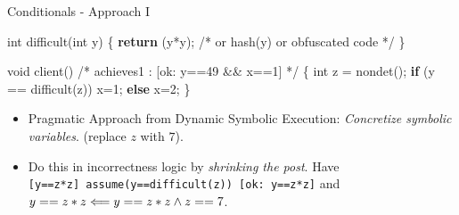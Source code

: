 \documentclass[
  10pt,
  ignorenonframetext,
]{beamer}
\newenvironment{Shaded}{\begin{snugshade}}{\end{snugshade}}
\newcommand{\CommentTok}[1]{\textcolor[rgb]{0.48,0.49,0.49}{#1}}
\newcommand{\ControlFlowTok}[1]{\textcolor[rgb]{0.99,0.74,0.29}{\textbf{#1}}}
\newcommand{\DataTypeTok}[1]{\textcolor[rgb]{0.16,0.50,0.73}{#1}}
\newcommand{\DecValTok}[1]{\textcolor[rgb]{0.96,0.45,0.00}{#1}}
\newcommand{\NormalTok}[1]{\textcolor[rgb]{0.81,0.81,0.76}{#1}}
\newcommand{\OperatorTok}[1]{\textcolor[rgb]{0.81,0.81,0.76}{#1}}
\newcommand{\simpliedby}{\DOTSB\Longleftarrow}
\begin{document}
\begin{frame}[fragile]{Conditionals - Approach I}
\label{conditionals---approach-i}
\begin{Shaded}
\begin{Highlighting}[]
\DataTypeTok{int}\NormalTok{ difficult}\OperatorTok{(}\DataTypeTok{int}\NormalTok{ y}\OperatorTok{)}
\OperatorTok{\{}   \ControlFlowTok{return} \OperatorTok{(}\NormalTok{y}\OperatorTok{*}\NormalTok{y}\OperatorTok{);} \CommentTok{/* or hash(y) or obfuscated code */}
\OperatorTok{\}}

\DataTypeTok{void}\NormalTok{ client}\OperatorTok{()}
\CommentTok{/* achieves1 : [ok: y==49 \&\& x==1] */}
\OperatorTok{\{}   \DataTypeTok{int}\NormalTok{ z }\OperatorTok{=}\NormalTok{ nondet}\OperatorTok{();}
    \ControlFlowTok{if} \OperatorTok{(}\NormalTok{y }\OperatorTok{==}\NormalTok{ difficult}\OperatorTok{(}\NormalTok{z}\OperatorTok{))}
\NormalTok{        x}\OperatorTok{=}\DecValTok{1}\OperatorTok{;}
    \ControlFlowTok{else}
\NormalTok{        x}\OperatorTok{=}\DecValTok{2}\OperatorTok{;}
\OperatorTok{\}}
\end{Highlighting}
\end{Shaded}

\begin{itemize}
\item
  Pragmatic Approach from Dynamic Symbolic Execution: \emph{Concretize
  symbolic variables}. (replace \(z\) with \(7\)).
\item
  Do this in incorrectness logic by \emph{shrinking the post}. Have
  \texttt{{[}y==z*z{]}\ assume(y==difficult(z))\ {[}ok:\ y==z*z{]}} and
  \(y == z*z \simpliedby y==z*z \land z==7\).
\end{itemize}
\end{frame}
\end{document}
